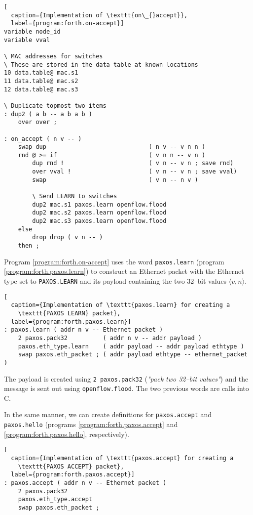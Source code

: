 \begin{lstlisting}[
  caption={Implementation of \texttt{on\_{}accept}},
  label={program:forth.on-accept}]
variable node_id
variable vval

\ MAC addresses for switches
\ These are stored in the data table at known locations
10 data.table@ mac.s1
11 data.table@ mac.s2
12 data.table@ mac.s3

\ Duplicate topmost two items
: dup2 ( a b -- a b a b )
    over over ;

: on_accept ( n v -- )
    swap dup                             ( n v -- v n n )
    rnd @ >= if                          ( v n n -- v n )
        dup rnd !                        ( v n -- v n ; save rnd)
        over vval !                      ( v n -- v n ; save vval)
        swap                             ( v n -- n v )

        \ Send LEARN to switches
        dup2 mac.s1 paxos.learn openflow.flood
        dup2 mac.s2 paxos.learn openflow.flood
        dup2 mac.s3 paxos.learn openflow.flood
    else
        drop drop ( v n -- )
    then ;
\end{lstlisting}

Program \ref{program:forth.on-accept} 
uses the word \texttt{paxos.learn} (program \ref{program:forth.paxos.learn})
to construct an Ethernet packet with the
Ethernet type set to \texttt{PAXOS.LEARN} and its payload containing the two
32--bit values $\langle v, n \rangle$.

\begin{lstlisting}[
  caption={Implementation of \texttt{paxos.learn} for creating a
    \texttt{PAXOS LEARN} packet},
  label={program:forth.paxos.learn}]
: paxos.learn ( addr n v -- Ethernet packet )
    2 paxos.pack32          ( addr n v -- addr payload )
    paxos.eth_type.learn    ( addr payload -- addr payload ethtype )
    swap paxos.eth_packet ; ( addr payload ethtype -- ethernet_packet )
\end{lstlisting}

The payload is created using
\texttt{2 paxos.pack32} (\textit{"pack two 32--bit values"}) and the message
is sent out using \texttt{openflow.flood}.  The two previous words are calls
into C.

In the same manner, we can create definitions for \texttt{paxos.accept} and
\texttt{paxos.hello} (programs \ref{program:forth.paxos.accept} and
\ref{program:forth.paxos.hello}, respectively).

\begin{lstlisting}[
  caption={Implementation of \texttt{paxos.accept} for creating a
    \texttt{PAXOS ACCEPT} packet},
  label={program:forth.paxos.accept}]
: paxos.accept ( addr n v -- Ethernet packet )
    2 paxos.pack32
    paxos.eth_type.accept
    swap paxos.eth_packet ;
\end{lstlisting}

